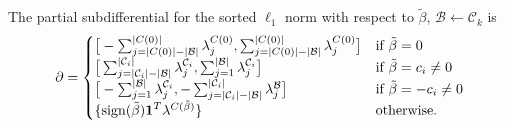 \begin{theorem}
  \label{thm:cluster-subdifferential}
  The partial subdifferential for the sorted \(\ell_1\) norm with respect
  to \(\tilde\beta\), \(\mathcal{B} \gets \mathcal{C}_k\)  is
  \[
    \partial =
    \begin{cases}
      \big[-\sum_{j=|C(0)|-|\mathcal{B}|}^{|C(0)|}\lambda^{C(0)}_j, \sum_{j=|C(0)|-|\mathcal{B}|}^{|C(0)|}\lambda^{C(0)}_j\big]                            & \text{if } \tilde\beta = 0           \\
      \big[\sum_{j=|\mathcal{C}_i| - |\mathcal{B}|}^{|\mathcal{C}_i|}\lambda^{\mathcal{C}_i}_j, \sum_{j=1}^{|\mathcal{B}|}\lambda^{\mathcal{C}_i}_j\big]   & \text{if } \tilde\beta = c_i \neq 0  \\
      \big[-\sum_{j=1}^{|\mathcal{B}|}\lambda^{\mathcal{C}_i}_j, -\sum_{j=|\mathcal{C}_i| - |\mathcal{B}|}^{|\mathcal{C}_i|}\lambda^{\mathcal{B}}_j\big] & \text{if } \tilde\beta = -c_i \neq 0 \\
      \{\operatorname{sign}(\tilde\beta)\boldsymbol{1}^T\lambda^{C(\tilde\beta)}\}                                                                                       & \text{otherwise.
      }
    \end{cases}
  \]
\end{theorem}
